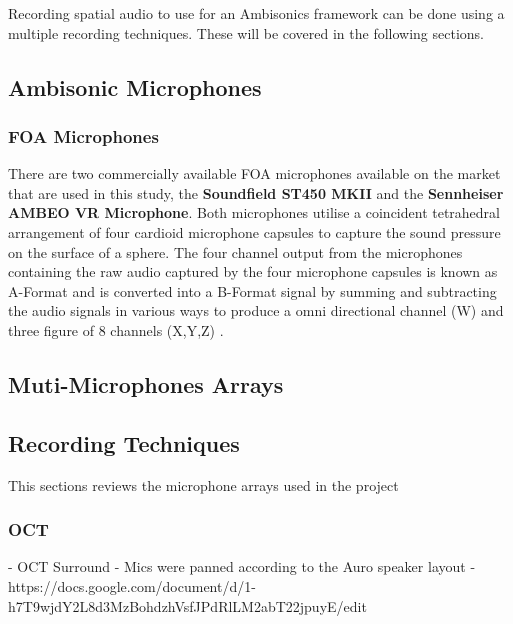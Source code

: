 		Recording spatial audio to use for an Ambisonics framework can be done using a multiple recording techniques. These will be covered in the following sections.


	\subsection{Ambisonic Microphones}

		\subsubsection{FOA Microphones}

			There are two commercially available FOA microphones available on the market that are used in this study, the \textbf{Soundfield ST450 MKII} and the \textbf{Sennheiser AMBEO VR Microphone}. Both microphones utilise a coincident tetrahedral arrangement of four cardioid microphone capsules to capture the sound pressure on the surface of a sphere. The four channel output from the microphones containing the raw audio captured by the four microphone capsules is known as A-Format and is converted into a B-Format signal by summing and subtracting the audio signals in various ways to produce a omni directional channel (W) and three figure of 8 channels (X,Y,Z) \cite{Power}.


	\subsection{Muti-Microphones Arrays} \label{lit:microphones}


	\subsection{Recording Techniques}

		This sections reviews the microphone arrays used in the project

		\subsubsection{OCT} \label{sec:OCT}

			- OCT Surround
		- Mics were panned according to the Auro speaker layout
			- https://docs.google.com/document/d/1-h7T9wjdY2L8d3MzBohdzhVsfJPdRlLM2abT22jpuyE/edit 